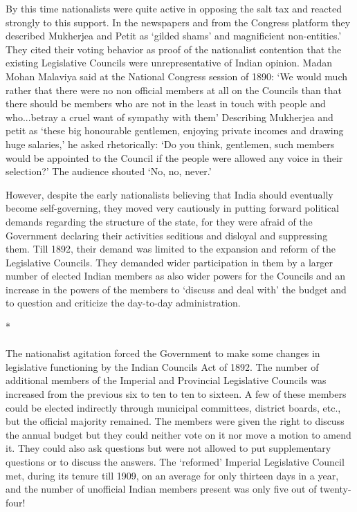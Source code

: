 By this time nationalists were quite active in opposing the salt tax and reacted strongly to this support. In the newspapers and from the Congress platform they described Mukherjea and Petit as `gilded shams' and magnificient non-entities.' They cited their voting behavior as proof of the nationalist contention that the existing Legislative Councils were unrepresentative of Indian opinion. Madan Mohan Malaviya said at the National Congress session of 1890: `We would much rather that there were no non­ official members at all on the Councils than that there should be members who are not in the least in touch with people and who...betray a cruel want of sympathy with them' Describing Mukherjea and petit as `these big honourable gentlemen, enjoying private incomes and drawing huge salaries,' he asked rhetorically: `Do you think, gentlemen, such members would be appointed to the Council if the people were allowed any voice in their selection?' The audience shouted `No, no, never.'

However, despite the early nationalists believing that India should eventually become self-governing, they moved very cautiously in putting forward political demands regarding the structure of the state, for they were afraid of the Government declaring their activities seditious and disloyal and suppressing them. Till 1892, their demand was limited to the expansion and reform of the Legislative Councils. They demanded wider participation in them by a larger number of elected Indian members as also wider powers for the Councils and an increase in the powers of the members to `discuss and deal with' the budget and to question and criticize the day-to-day administration.

\begin{center}*\end{center}

\paragraph*{}


The nationalist agitation forced the Government to make some changes in legislative functioning by the Indian Councils Act of 1892. The number of additional members of the Imperial and Provincial Legislative Councils was increased from the previous six to ten to ten to sixteen. A few of these members could be elected indirectly through municipal committees, district boards, etc., but the official majority remained. The members were given the right to discuss the annual budget but they could neither vote on it nor move a motion to amend it. They could also ask questions but were not allowed to put supplementary questions or to discuss the answers. The `reformed' Imperial Legislative Council met, during its tenure till 1909, on an average for only thirteen days in a year, and the number of unofficial Indian members present was only five out of twenty- four!

